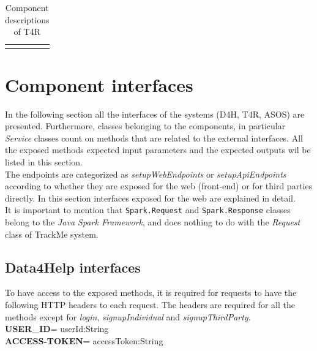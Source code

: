 \documentclass[a4paper, hidelinks, 12pt]{report}
\begin{document}
\begin{longtable}{l p{}}
			\hline
			\caption{Component descriptions of T4R}
			\label{table:t4r_component_descriptions}
		\end{longtable}
		
	\section{Component interfaces}
	In the following section all the interfaces of the systems (D4H, T4R, ASOS) are presented. Furthermore, classes belonging to the components, in particular \textit{Service} classes count on methods that are related to the external interfaces. All the  exposed methods expected input parameters and the expected outputs wil be listed in this section.  \\
	
	The endpoints are categorized as \textit{setupWebEndpoints} or \textit{setupApiEndpoints} according to whether they are exposed for the web (front-end) or for third parties directly.  In this section interfaces exposed for the web are explained in detail.\\
	
	It is important to mention that \verb|Spark.Request| and \verb|Spark.Response| classes belong to the \textit{Java Spark Framework}, and does nothing to do with the \textit{Request} class of TrackMe system. 
		
	\subsection{Data4Help interfaces}	
	To have access to the exposed methods, it is required for requests to have the following HTTP headers to each request. 	The headers are required for all the methods except for \textit{login},  \textit{signupIndividual} and \textit{signupThirdParty}.\\
	\textbf{USER\_ID}= userId:String \\
	\textbf{ACCESS-TOKEN}= accessToken:String \\
\end{document}
